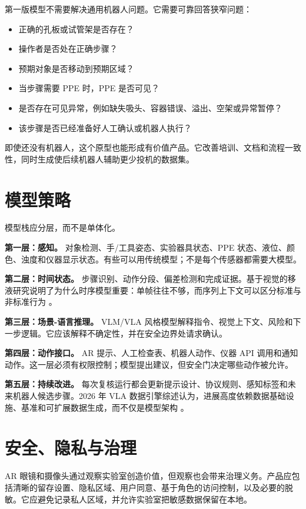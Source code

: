 \documentclass[11pt,fontset=none]{ctexart}
\begin{document}
第一版模型不需要解决通用机器人问题。它需要可靠回答狭窄问题：

\begin{itemize}
  \item 正确的孔板或试管架是否存在？
  \item 操作者是否处在正确步骤？
  \item 预期对象是否移动到预期区域？
  \item 当步骤需要 PPE 时，PPE 是否可见？
  \item 是否存在可见异常，例如缺失吸头、容器错误、溢出、空架或异常暂停？
  \item 该步骤是否已经准备好人工确认或机器人执行？
\end{itemize}

即使还没有机器人，这个原型也能形成有价值产品。它改善培训、文档和流程一致性，同时生成使后续机器人辅助更少投机的数据集。

\section{模型策略}

模型栈应分层，而不是单体化。

\textbf{第一层：感知。} 对象检测、手/工具姿态、实验器具状态、PPE 状态、液位、颜色、浊度和仪器显示状态。有些可以用传统模型；不是每个传感器都需要大模型。

\textbf{第二层：时间状态。} 步骤识别、动作分段、偏差检测和完成证据。基于视觉的移液研究说明了为什么时序模型重要：单帧往往不够，而序列上下文可以区分标准与非标准行为 \cite{guo2026pipetting}。

\textbf{第三层：场景-语言推理。} VLM/VLA 风格模型解释指令、视觉上下文、风险和下一步逻辑。它应该解释不确定性，并在安全边界处请求确认。

\textbf{第四层：动作接口。} AR 提示、人工检查表、机器人动作、仪器 API 调用和通知动作。这一层必须有权限控制；模型提出建议，但安全门决定哪些动作被允许。

\textbf{第五层：持续改进。} 每次复核运行都会更新提示设计、协议规则、感知标签和未来机器人候选步骤。2026 年 VLA 数据引擎综述认为，进展高度依赖数据基础设施、基准和可扩展数据生成，而不仅是模型架构 \cite{vlasurvey2026}。

\section{安全、隐私与治理}

AR 眼镜和摄像头通过观察实验室创造价值，但观察也会带来治理义务。产品应包括清晰的留存设置、隐私区域、用户同意、基于角色的访问控制，以及必要的脱敏。它应避免记录私人区域，并允许实验室把敏感数据保留在本地。
\end{document}
